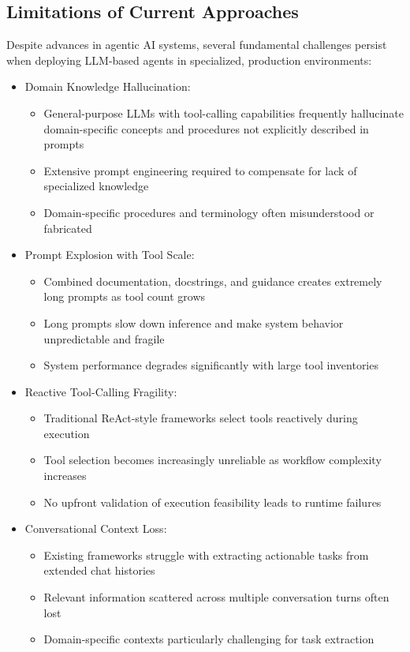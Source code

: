 
\subsection{Limitations of Current Approaches}
\label{sec:current-limitations}

Despite advances in agentic AI systems, several fundamental challenges persist when deploying LLM-based agents in specialized, production environments:

\begin{itemize}
    \item Domain Knowledge Hallucination:
    \begin{itemize}
        \item General-purpose LLMs with tool-calling capabilities frequently hallucinate domain-specific concepts and procedures not explicitly described in prompts
        \item Extensive prompt engineering required to compensate for lack of specialized knowledge
        \item Domain-specific procedures and terminology often misunderstood or fabricated
    \end{itemize}

    \item Prompt Explosion with Tool Scale:
    \begin{itemize}
        \item Combined documentation, docstrings, and guidance creates extremely long prompts as tool count grows
        \item Long prompts slow down inference and make system behavior unpredictable and fragile
        \item System performance degrades significantly with large tool inventories
    \end{itemize}

    \item Reactive Tool-Calling Fragility:
    \begin{itemize}
        \item Traditional ReAct-style frameworks select tools reactively during execution
        \item Tool selection becomes increasingly unreliable as workflow complexity increases
        \item No upfront validation of execution feasibility leads to runtime failures
    \end{itemize}

    \item Conversational Context Loss:
    \begin{itemize}
        \item Existing frameworks struggle with extracting actionable tasks from extended chat histories
        \item Relevant information scattered across multiple conversation turns often lost
        \item Domain-specific contexts particularly challenging for task extraction
    \end{itemize}


\end{itemize}
